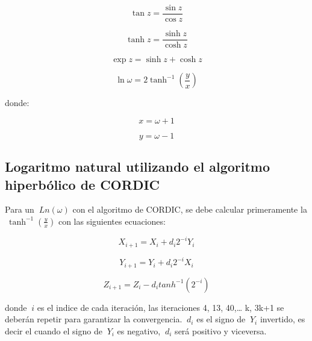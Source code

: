 \begin{equation} \label{eq:ej17}
  \tan z = \frac{\sin z}{\cos z}
\end{equation}

\begin{equation} \label{eq:ej18}
  \tanh z = \frac{\sinh z}{\cosh z}
\end{equation}

\begin{equation} \label{eq:ej19}
  \exp z = \sinh z + \cosh z
\end{equation}

\begin{equation} \label{eq:ej20}
  \ln \omega = 2 \tanh^{-1} \left( \frac{y}{x} \right)
\end{equation}

donde: 

\begin{equation} \label{eq:ej21}
  x = \omega + 1
\end{equation}

\begin{equation} \label{eq:ej22}
  y = \omega - 1
\end{equation}

\subsection{Logaritmo natural utilizando el algoritmo hiperbólico de CORDIC}
Para un $\ Ln \left(\omega\right) $  con el algoritmo de CORDIC, se debe calcular primeramente la $\ \tanh^{-1} \left( \frac{y}{x} \right)$ con las siguientes ecuaciones:

 
\begin{equation} \label{eq:ej23}
  X_{i+1} = X_{i} + d_{i} 2^{-i} Y_{i}  
\end{equation}

\begin{equation} \label{eq:ej24}
  Y_{i+1} = Y_{i} + d_{i} 2^{-i} X_{i}  
\end{equation}

\begin{equation} \label{eq:ej25}
  Z_{i+1} = Z_{i} - d_{i} tanh^{-1}\left(2^{-i}\right)
\end{equation}

donde $\ i $ es el indice de cada iteración, las iteraciones 4, 13, 40,… k, 3k+1 se deberán repetir para garantizar la convergencia. $\ d_i $ es el signo de $\ Y_i $ invertido, es decir el cuando el signo de $\ Y_i $ es negativo, $\ d_i $ será positivo y viceversa.

